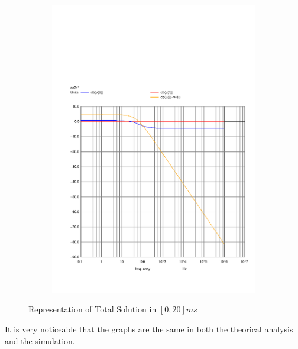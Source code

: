 \begin{figure}[h]
\begin{subfigure}{0.23\textwidth}
    \includegraphics[width=\linewidth, clip]{../sim/mag.pdf}
  \end{subfigure}

  \caption{\small Representation of Total Solution in $[0,20]ms$}
\end{figure}

It is very noticeable that the graphs are the same in both the theorical analysis and the simulation.

